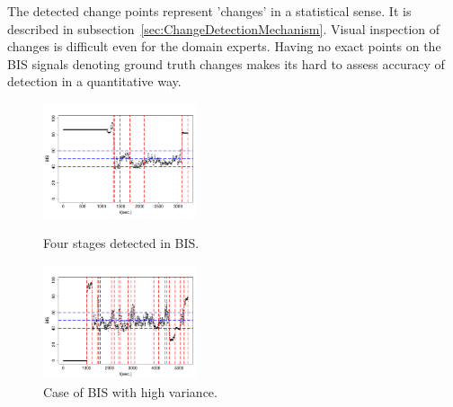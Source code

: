 The detected change points represent 'changes' in a statistical
sense. It is described in subsection~\ref{sec:ChangeDetectionMechanism}.
Visual inspection of changes is difficult even for the domain experts.
Having no exact points on the BIS signals denoting ground truth
changes makes its hard to assess accuracy of detection in a
quantitative way.
\begin{figure}[htb!]
\centering
\includegraphics[width=0.40\textwidth]{./articles/pics/aclac_paper/ChangeDetectionImage4.pdf}
\caption{Four stages detected in BIS.}
\label{fig:ChangeDetection1}
\centering
\includegraphics[width=0.40\textwidth]{./articles/pics/aclac_paper/ChangeDetectionImage6.pdf}
\caption{Case of BIS with high variance.}
\label{fig:ChangeDetection2}
\end{figure}
